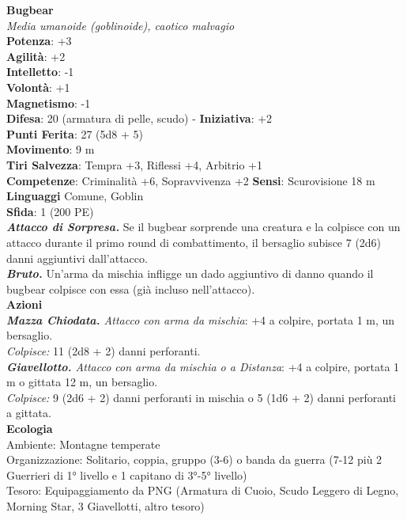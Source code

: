 \begin{multicols}{2}
\medskip\textbf{Bugbear}\\
\emph{Media umanoide (goblinoide), caotico malvagio}\\
\textbf{Potenza}: +3\\
\textbf{Agilità}: +2\\
\textbf{Intelletto}: -1\\
\textbf{Volontà}: +1\\
\textbf{Magnetismo}: -1\\
\textbf{Difesa}: 20 (armatura di pelle, scudo) - \textbf{Iniziativa}: +2\\
\textbf{Punti Ferita}: 27 (5d8 + 5)\\
\textbf{Movimento}: 9 m\\
\textbf{Tiri Salvezza}: Tempra +3, Riflessi +4, Arbitrio +1\\
\textbf{Competenze}: Criminalità +6, Sopravvivenza +2
\textbf{Sensi}: Scurovisione 18 m \\
\textbf{Linguaggi} Comune, Goblin\\
\textbf{Sfida}: 1 (200 PE)\smallskip\\
\emph{\textbf{Attacco di Sorpresa.}} Se il bugbear sorprende una creatura e la colpisce con un attacco durante il primo round di combattimento, il bersaglio subisce 7 (2d6) danni aggiuntivi dall'attacco.\\
\emph{\textbf{Bruto.}} Un'arma da mischia infligge un dado aggiuntivo di danno quando il bugbear colpisce con essa (già incluso nell'attacco).\\
\smallskip\textbf{Azioni}\\
\emph{\textbf{Mazza Chiodata.} Attacco con arma da mischia}: +4 a colpire, portata 1 m, un bersaglio.\\
\emph{Colpisce:} 11 (2d8 + 2) danni perforanti.\\
\emph{\textbf{Giavellotto.} Attacco con arma da mischia o a Distanza}: +4 a colpire, portata 1 m o gittata 12 m, un bersaglio.\\
\emph{Colpisce:} 9 (2d6 + 2) danni perforanti in mischia o 5 (1d6 + 2) danni perforanti a gittata.\\
\textbf{Ecologia}\\
Ambiente: Montagne temperate\\
Organizzazione: Solitario, coppia, gruppo (3-6) o banda da guerra (7-12 più 2 Guerrieri di 1° livello e 1 capitano di 3°-5° livello)\\
Tesoro: Equipaggiamento da PNG (Armatura di Cuoio, Scudo Leggero di Legno, Morning Star, 3 Giavellotti, altro tesoro)\\

\end{multicols}
